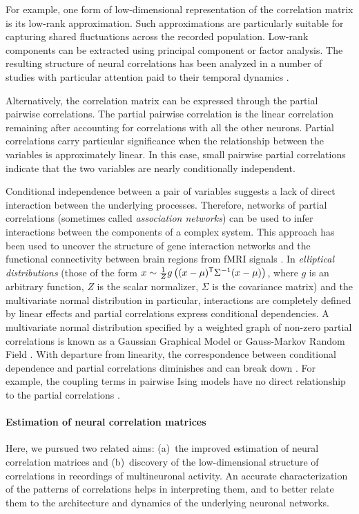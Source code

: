 \documentclass[10pt]{article}
\newcommand{\T}{{\sf T}}
\begin{document}
For example, one form of low-dimensional representation of the correlation matrix is its low-rank approximation. Such approximations are particularly suitable for capturing shared fluctuations across the recorded population. Low-rank components can be extracted using principal component or factor analysis. The resulting structure of  neural correlations has been analyzed in a number of studies with particular attention paid to their temporal dynamics \cite{Yu:2009}.

Alternatively, the correlation matrix can be expressed through the partial pairwise correlations. The partial pairwise correlation is the linear correlation remaining after accounting for correlations with all the other neurons. Partial correlations carry particular significance when the relationship between the variables is approximately linear. In this case, small pairwise partial correlations indicate that the two variables are nearly conditionally independent.  

Conditional independence between a pair of variables suggests a lack of direct interaction between the underlying processes. Therefore, networks of partial correlations (sometimes called \emph{association networks}) can be used to infer interactions between the components of a complex system.  This approach has been used to uncover the structure of gene interaction networks \cite{Schafer:2005,Peng:2009} and the functional connectivity between brain regions from fMRI signals \cite{Varoquaux:2012,Ryali:2012}. In \emph{elliptical distributions} (those of the form $x \sim \frac 1 Z g\left((x-\mu)^\T\Sigma^{-1}(x-\mu)\right)$, where $g$ is an arbitrary function, $Z$ is the scalar normalizer, $\Sigma$ is the covariance matrix) and the multivariate normal distribution in particular, interactions are completely defined by linear effects and partial correlations express conditional dependencies. A multivariate normal distribution specified by a weighted graph of non-zero partial correlations is known as a Gaussian Graphical Model or Gauss-Markov Random Field \cite{Koller:2009}. With departure from linearity, the correspondence between conditional dependence and partial correlations diminishes and can break down \cite{Loh:2012}. For example, the coupling terms in pairwise Ising models have no direct relationship to the partial correlations \cite{Schneidman:2006, Tkacik:2006}.

\paragraph{Estimation of neural correlation matrices}
Here, we pursued two related aims: (a)~the improved estimation of neural correlation matrices and (b)~discovery of the low-dimensional structure of correlations in recordings of multineuronal activity. An accurate characterization of the patterns of correlations helps in interpreting them, and to better relate them to the architecture and dynamics of the underlying neuronal networks.   
\end{document}
